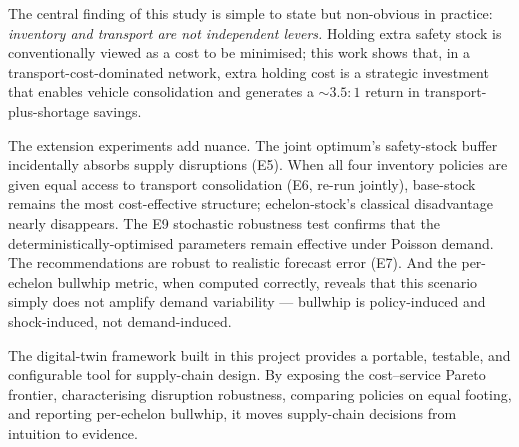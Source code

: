 The central finding of this study is simple to state but non-obvious in
practice: \emph{inventory and transport are not independent levers.}
Holding extra safety stock is conventionally viewed as a cost to be
minimised; this work shows that, in a transport-cost-dominated network,
extra holding cost is a strategic investment that enables vehicle
consolidation and generates a ${\sim}3.5{:}1$ return in
transport-plus-shortage savings.

The extension experiments add nuance.  The joint optimum's safety-stock
buffer incidentally absorbs supply disruptions (E5).  When all four
inventory policies are given equal access to transport consolidation
(E6, re-run jointly), base-stock remains the most cost-effective
structure; echelon-stock's classical disadvantage nearly disappears.
The E9 stochastic robustness test confirms that the
deterministically-optimised parameters remain effective under Poisson
demand.  The recommendations are robust to realistic
forecast error (E7).  And the per-echelon bullwhip metric, when
computed correctly, reveals that this scenario simply does not amplify
demand variability — bullwhip is policy-induced and shock-induced, not
demand-induced.

The digital-twin framework built in this project provides a portable,
testable, and configurable tool for supply-chain design.  By exposing
the cost--service Pareto frontier, characterising disruption robustness,
comparing policies on equal footing, and reporting per-echelon bullwhip,
it moves supply-chain decisions from intuition to evidence.
